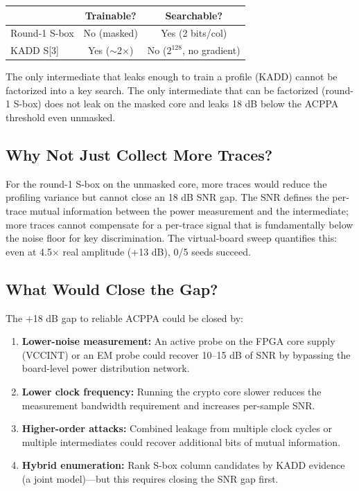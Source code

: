 \documentclass[a4paper,11pt,twocolumn]{article}
\begin{document}
\begin{center}
\begin{tabular}{lcc}
\toprule
& Trainable? & Searchable? \\
\midrule
Round-1 S-box & No (masked) & Yes (2 bits/col) \\
KADD S[3] & Yes ($\sim$2$\times$) & No ($2^{128}$, no gradient) \\
\bottomrule
\end{tabular}
\end{center}

The only intermediate that leaks enough to train a profile (KADD) cannot be factorized into a key search. The only intermediate that can be factorized (round-1 S-box) does not leak on the masked core and leaks 18 dB below the ACPPA threshold even unmasked.

\subsection{Why Not Just Collect More Traces?}

For the round-1 S-box on the unmasked core, more traces would reduce the profiling variance but cannot close an 18 dB SNR gap. The SNR defines the per-trace mutual information between the power measurement and the intermediate; more traces cannot compensate for a per-trace signal that is fundamentally below the noise floor for key discrimination. The virtual-board sweep quantifies this: even at 4.5$\times$ real amplitude (+13 dB), 0/5 seeds succeed.

\subsection{What Would Close the Gap?}

The +18 dB gap to reliable ACPPA could be closed by:
\begin{enumerate}[leftmargin=*,nosep]
\item \textbf{Lower-noise measurement:} An active probe on the FPGA core supply (VCCINT) or an EM probe could recover 10--15 dB of SNR by bypassing the board-level power distribution network.
\item \textbf{Lower clock frequency:} Running the crypto core slower reduces the measurement bandwidth requirement and increases per-sample SNR.
\item \textbf{Higher-order attacks:} Combined leakage from multiple clock cycles or multiple intermediates could recover additional bits of mutual information.
\item \textbf{Hybrid enumeration:} Rank S-box column candidates by KADD evidence (a joint model)---but this requires closing the SNR gap first.
\end{enumerate}
\end{document}
